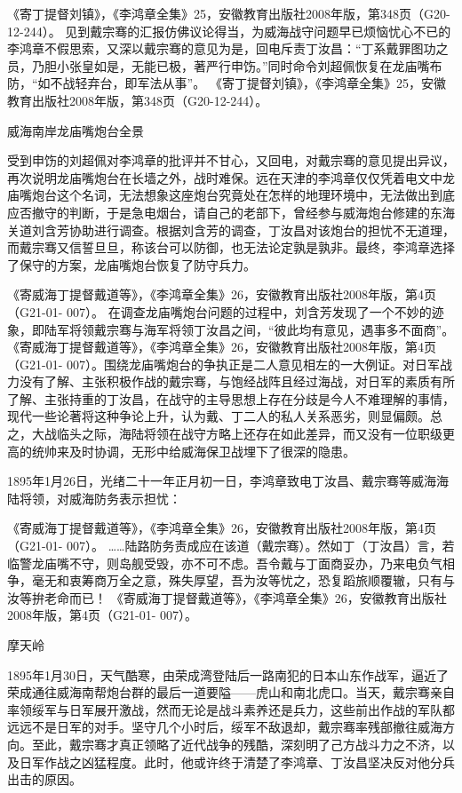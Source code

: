 \documentclass[12pt,UTF8]{ctexbook}
\begin{document}
《寄丁提督刘镇》，《李鸿章全集》25，安徽教育出版社2008年版，第348页（G20-12-244）。
见到戴宗骞的汇报仿佛议论得当，为威海战守问题早已烦恼忧心不已的李鸿章不假思索，又深以戴宗骞的意见为是，回电斥责丁汝昌：“丁系戴罪图功之员，乃胆小张皇如是，无能已极，著严行申饬。”同时命令刘超佩恢复在龙庙嘴布防，“如不战轻弃台，即军法从事”。 《寄丁提督刘镇》，《李鸿章全集》25，安徽教育出版社2008年版，第348页（G20-12-244）。


威海南岸龙庙嘴炮台全景

受到申饬的刘超佩对李鸿章的批评并不甘心，又回电，对戴宗骞的意见提出异议，再次说明龙庙嘴炮台在长墙之外，战时难保。远在天津的李鸿章仅仅凭着电文中龙庙嘴炮台这个名词，无法想象这座炮台究竟处在怎样的地理环境中，无法做出到底应否撤守的判断，于是急电烟台，请自己的老部下，曾经参与威海炮台修建的东海关道刘含芳协助进行调查。根据刘含芳的调查，丁汝昌对该炮台的担忧不无道理，而戴宗骞又信誓旦旦，称该台可以防御，也无法论定孰是孰非。最终，李鸿章选择了保守的方案，龙庙嘴炮台恢复了防守兵力。

《寄威海丁提督戴道等》，《李鸿章全集》26，安徽教育出版社2008年版，第4页（G21-01- 007）。
在调查龙庙嘴炮台问题的过程中，刘含芳发现了一个不妙的迹象，即陆军将领戴宗骞与海军将领丁汝昌之间，“彼此均有意见，遇事多不面商”。 《寄威海丁提督戴道等》，《李鸿章全集》26，安徽教育出版社2008年版，第4页（G21-01- 007）。围绕龙庙嘴炮台的争执正是二人意见相左的一大例证。对日军战力没有了解、主张积极作战的戴宗骞，与饱经战阵且经过海战，对日军的素质有所了解、主张持重的丁汝昌，在战守的主导思想上存在分歧是今人不难理解的事情，现代一些论著将这种争论上升，认为戴、丁二人的私人关系恶劣，则显偏颇。总之，大战临头之际，海陆将领在战守方略上还存在如此差异，而又没有一位职级更高的统帅来及时协调，无形中给威海保卫战埋下了很深的隐患。

1895年1月26日，光绪二十一年正月初一日，李鸿章致电丁汝昌、戴宗骞等威海海陆将领，对威海防务表示担忧：

《寄威海丁提督戴道等》，《李鸿章全集》26，安徽教育出版社2008年版，第4页（G21-01- 007）。
……陆路防务责成应在该道（戴宗骞）。然如丁（丁汝昌）言，若临警龙庙嘴不守，则岛舰受毁，亦不可不虑。吾令戴与丁面商妥办，乃来电负气相争，毫无和衷筹商万全之意，殊失厚望，吾为汝等忧之，恐复蹈旅顺覆辙，只有与汝等拚老命而已！ 《寄威海丁提督戴道等》，《李鸿章全集》26，安徽教育出版社2008年版，第4页（G21-01- 007）。

摩天岭

1895年1月30日，天气酷寒，由荣成湾登陆后一路南犯的日本山东作战军，逼近了荣成通往威海南帮炮台群的最后一道要隘——虎山和南北虎口。当天，戴宗骞亲自率领绥军与日军展开激战，然而无论是战斗素养还是兵力，这些前出作战的军队都远远不是日军的对手。坚守几个小时后，绥军不敌退却，戴宗骞率残部撤往威海方向。至此，戴宗骞才真正领略了近代战争的残酷，深刻明了己方战斗力之不济，以及日军作战之凶猛程度。此时，他或许终于清楚了李鸿章、丁汝昌坚决反对他分兵出击的原因。
\end{document}

